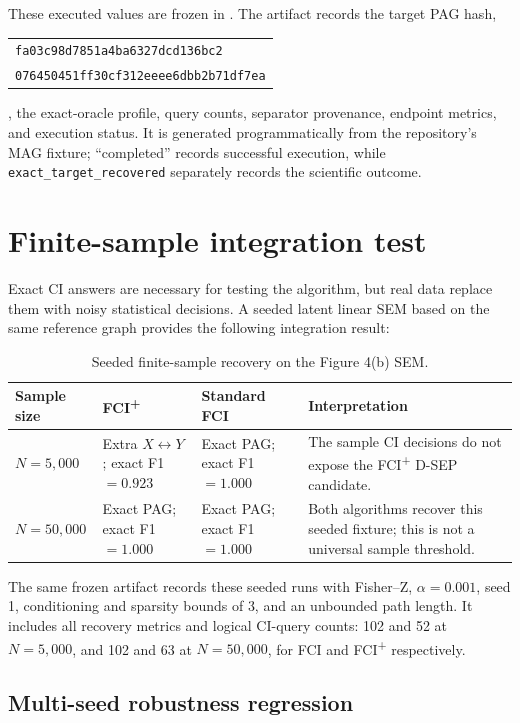 \documentclass[11pt,a4paper,oneside]{report}
\makeatletter
\newcommand{\FCIplus}{FCI\textsuperscript{+}}
\newcommand{\code}[1]{\texttt{#1}}
\newcommand{\hash}[2]{%
  \begin{tabular}{@{}l@{}}
  \texttt{\footnotesize #1}\\[-0.2em]
  \texttt{\footnotesize #2}
  \end{tabular}}
\makeatother
\begin{document}
These executed values are frozen in
.  The artifact records the
target PAG hash,
\hash{fa03c98d7851a4ba6327dcd136bc2}
     {076450451ff30cf312eeee6dbb2b71df7ea},
the exact-oracle profile, query counts, separator provenance, endpoint
metrics, and execution status.  It is generated programmatically from the
repository's MAG fixture; ``completed'' records successful execution, while
\code{exact\_target\_recovered} separately records the scientific outcome.

\section{Finite-sample integration test}

Exact CI answers are necessary for testing the algorithm, but real data
replace them with noisy statistical decisions. A seeded latent linear SEM
based on the same reference graph provides the following integration result:

\begin{table}[H]
\centering
\caption{Seeded finite-sample recovery on the Figure 4(b) SEM.}
\label{tab:finite-sample}
\begin{tabularx}{\textwidth}{p{}p{}p{}Y}
\toprule
Sample size & \FCIplus{} & Standard FCI & Interpretation \\
\midrule
\(N=5{,}000\) & Extra \(X\leftrightarrow Y\); exact F1 \(=0.923\) &
Exact PAG; exact F1 \(=1.000\) &
The sample CI decisions do not expose the \FCIplus{} D-SEP candidate. \\
\(N=50{,}000\) & Exact PAG; exact F1 \(=1.000\) &
Exact PAG; exact F1 \(=1.000\) &
Both algorithms recover this seeded fixture; this is not a universal sample
threshold. \\
\bottomrule
\end{tabularx}
\end{table}

The same frozen artifact records these seeded runs with Fisher--Z,
\(\alpha=0.001\), seed 1, conditioning and sparsity bounds of 3, and an
unbounded path length.  It includes all recovery metrics and logical CI-query
counts: 102 and 52 at \(N=5{,}000\), and 102 and 63 at \(N=50{,}000\), for FCI
and \FCIplus{} respectively.

\subsection{Multi-seed robustness regression}
\end{document}
